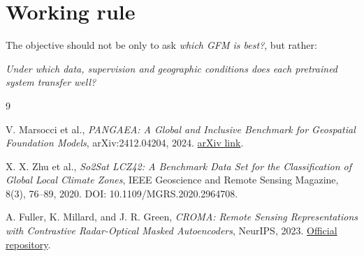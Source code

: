 \documentclass[11pt,a4paper]{article}
\begin{document}
\section*{Working rule}

The objective should not be only to ask \emph{which GFM is best?}, but rather:

\emph{Under which data, supervision and geographic conditions does each pretrained system transfer well?}

\begin{thebibliography}{9}

V. Marsocci et al.,
\textit{PANGAEA: A Global and Inclusive Benchmark for Geospatial Foundation Models},
arXiv:2412.04204, 2024.
\href{https://arxiv.org/abs/2412.04204}{arXiv link}.

X. X. Zhu et al.,
\textit{So2Sat LCZ42: A Benchmark Data Set for the Classification of Global Local Climate Zones},
IEEE Geoscience and Remote Sensing Magazine, 8(3), 76--89, 2020.
DOI: 10.1109/MGRS.2020.2964708.

A. Fuller, K. Millard, and J. R. Green,
\textit{CROMA: Remote Sensing Representations with Contrastive Radar-Optical Masked Autoencoders},
NeurIPS, 2023.
\href{https://github.com/antofuller/CROMA}{Official repository}.

\end{thebibliography}
\end{document}
